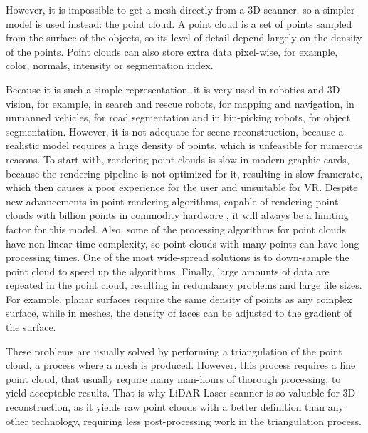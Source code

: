 However, it is impossible to get a mesh directly from a 3D scanner, so a simpler model is used instead: the point cloud. A point cloud is a set of points sampled from the surface of the objects, so its level of  detail depend largely on the density of the points. Point clouds can also store extra data pixel-wise, for example, color, normals, intensity or segmentation index.

Because it is such a simple representation, it is very used in robotics and 3D vision, for example, in search and rescue robots, for mapping and navigation, in unmanned vehicles, for road segmentation and in bin-picking robots, for object segmentation. However, it is not adequate for scene reconstruction, because a realistic model requires a huge density of points, which is unfeasible for numerous reasons. To start with, rendering point clouds is slow in modern graphic cards, because the rendering pipeline is not optimized for it, resulting in slow framerate, which then causes a poor experience for the user and unsuitable for VR. Despite new advancements in point-rendering algorithms, capable of rendering point clouds with billion points in commodity hardware \cite{wimmer2006}, it will always be a limiting factor for this model. Also, some of the processing algorithms for point clouds have non-linear time complexity, so point clouds with many points can have long processing times. One of the most wide-spread solutions is to down-sample the point cloud to speed up the algorithms. Finally, large amounts of data are repeated in the point cloud, resulting in redundancy problems and large file sizes. For example, planar surfaces require the same density of points as any complex surface, while in meshes, the density of faces can be adjusted to the gradient of the surface.

These problems are usually solved by performing a triangulation of the point cloud, a process where a mesh is produced. However, this process requires a fine point cloud, that usually require many man-hours of thorough processing, to yield acceptable results. That is why LiDAR Laser scanner is so valuable for 3D reconstruction, as it yields raw point clouds with a better definition than any other technology, requiring less post-processing work in the triangulation process.
